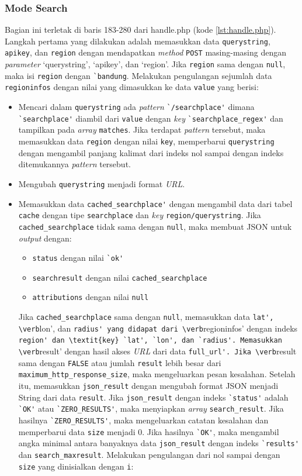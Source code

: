 \subsubsection{Mode Search}
Bagian ini terletak di baris 183-280 dari handle.php (kode \ref{lst:handle.php}). Langkah pertama yang dilakukan adalah memasukkan data \verb!querystring!, \verb!apikey!, dan \verb!region! dengan mendapatkan \textit{method} \verb!POST! masing-masing dengan \textit{parameter} `querystring', `apikey', dan `region'. Jika \verb!region! sama dengan \verb!null!, maka isi \verb!region! dengan \verb!`bandung!. Melakukan pengulangan sejumlah data \verb!regioninfos! dengan nilai yang dimasukkan ke data \verb!value! yang berisi:
\begin{itemize}
	\item Mencari dalam \verb!querystring! ada \textit{pattern} \verb!`/searchplace'! dimana \verb!`searchplace'! diambil dari \verb!value! dengan \textit{key} \verb!`searchplace_regex'! dan tampilkan pada \textit{array} \verb!matches!. Jika terdapat \textit{pattern} tersebut, maka memasukkan data \verb!region! dengan nilai \verb!key!, memperbarui \verb!querystring! dengan mengambil panjang kalimat dari indeks nol sampai dengan indeks ditemukannya \textit{pattern} tersebut.
	\item Mengubah \verb!querystring! menjadi format \textit{URL}.
	\item Memasukkan data \verb!cached_searchplace'! dengan mengambil data dari tabel \verb!cache! dengan tipe \verb!searchplace! dan \textit{key} \verb!region/querystring!. Jika \verb!cached_searchplace! tidak sama dengan \verb!null!, maka membuat JSON untuk \textit{output} dengan:
	\begin{itemize}
		\item \verb!status! dengan nilai \verb!`ok'!
		\item \verb!searchresult! dengan nilai \verb!cached_searchplace!
		\item \verb!attributions! dengan nilai \verb!null!
	\end{itemize}
	Jika \verb!cached_searchplace! sama dengan \verb!null!, memasukkan data \verb!lat', \verb!lon', dan \verb!radius' yang didapat dari \verb!regioninfos' dengan indeks \verb!region' dan \textit{key} `lat', `lon', dan `radius'. Memasukkan \verb!result' dengan hasil akses \textit{URL} dari data \verb!full_url'. Jika \verb!result sama dengan \verb!FALSE! atau jumlah \verb!result! lebih besar dari \verb!maximum_http_response_size!, maka mengeluarkan pesan kesalahan. 
	Setelah itu, memasukkan \verb!json_result! dengan mengubah format JSON menjadi String dari data \verb!result!. Jika \verb!json_result! dengan indeks \verb!`status'! adalah \verb!`OK'! atau \verb!`ZERO_RESULTS'!, maka menyiapkan \textit{array} \verb!search_result!. Jika hasilnya \verb!`ZERO_RESULTS'!, maka mengeluarkan catatan kesalahan dan memperbarui data \verb!size! menjadi 0. Jika hasilnya \verb!`OK'!, maka mengambil angka minimal antara banyaknya data \verb!json_result! dengan indeks \verb!`results'! dan \verb!search_maxresult!. Melakukan pengulangan dari nol sampai dengan \verb!size! yang dinisialkan dengan \verb!i!:

\end{itemize}
